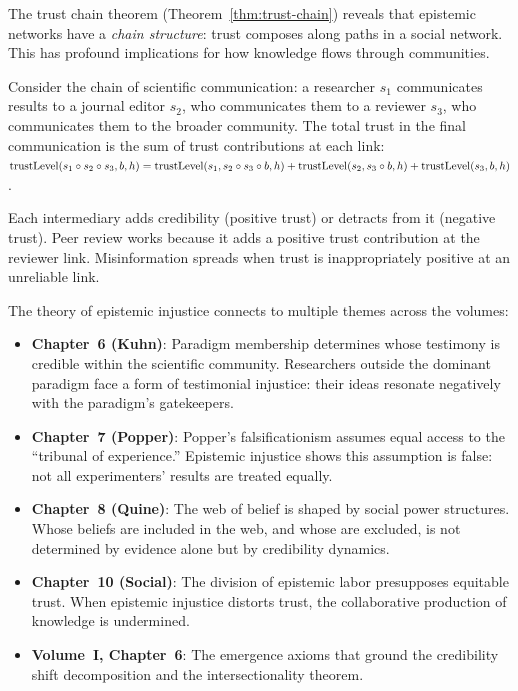 \begin{remark}
The trust chain theorem (Theorem~\ref{thm:trust-chain}) reveals that epistemic
networks have a \emph{chain structure}: trust composes along paths in a social
network. This has profound implications for how knowledge flows through communities.

Consider the chain of scientific communication: a researcher $s_1$ communicates
results to a journal editor $s_2$, who communicates them to a reviewer $s_3$,
who communicates them to the broader community. The total trust in the final
communication is the sum of trust contributions at each link:
$\mathrm{trustLevel}(s_1 \circ s_2 \circ s_3, b, h) =
\mathrm{trustLevel}(s_1, s_2 \circ s_3 \circ b, h) +
\mathrm{trustLevel}(s_2, s_3 \circ b, h) +
\mathrm{trustLevel}(s_3, b, h)$.

Each intermediary adds credibility (positive trust) or detracts from it
(negative trust). Peer review works because it adds a positive trust
contribution at the reviewer link. Misinformation spreads when trust is
inappropriately positive at an unreliable link.
\end{remark}

\begin{remark}
The theory of epistemic injustice connects to multiple themes across the volumes:

\begin{itemize}
\item \textbf{Chapter~6 (Kuhn)}: Paradigm membership determines whose testimony
  is credible within the scientific community. Researchers outside the dominant
  paradigm face a form of testimonial injustice: their ideas resonate negatively
  with the paradigm's gatekeepers.
\item \textbf{Chapter~7 (Popper)}: Popper's falsificationism assumes equal access
  to the ``tribunal of experience.'' Epistemic injustice shows this assumption
  is false: not all experimenters' results are treated equally.
\item \textbf{Chapter~8 (Quine)}: The web of belief is shaped by social power
  structures. Whose beliefs are included in the web, and whose are excluded,
  is not determined by evidence alone but by credibility dynamics.
\item \textbf{Chapter~10 (Social)}: The division of epistemic labor presupposes
  equitable trust. When epistemic injustice distorts trust, the collaborative
  production of knowledge is undermined.
\item \textbf{Volume~I, Chapter~6}: The emergence axioms that ground the
  credibility shift decomposition and the intersectionality theorem.
\end{itemize}
\end{remark}

